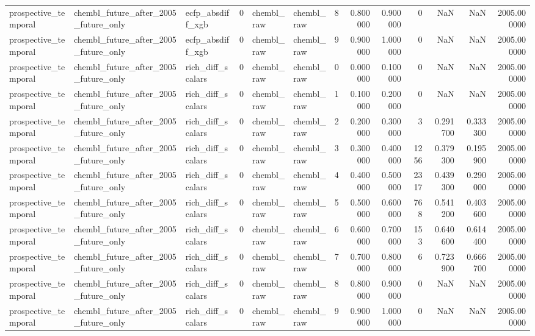 \begin{longtable}{lllrllrrrrrrr}
prospective\_temporal & chembl\_future\_after\_2005\_future\_only & ecfp\_absdiff\_xgb & 0 & chembl\_raw & chembl\_raw & 8 & 0.800000 & 0.900000 & 0 & NaN & NaN & 2005.000000 \\
prospective\_temporal & chembl\_future\_after\_2005\_future\_only & ecfp\_absdiff\_xgb & 0 & chembl\_raw & chembl\_raw & 9 & 0.900000 & 1.000000 & 0 & NaN & NaN & 2005.000000 \\
prospective\_temporal & chembl\_future\_after\_2005\_future\_only & rich\_diff\_scalars & 0 & chembl\_raw & chembl\_raw & 0 & 0.000000 & 0.100000 & 0 & NaN & NaN & 2005.000000 \\
prospective\_temporal & chembl\_future\_after\_2005\_future\_only & rich\_diff\_scalars & 0 & chembl\_raw & chembl\_raw & 1 & 0.100000 & 0.200000 & 0 & NaN & NaN & 2005.000000 \\
prospective\_temporal & chembl\_future\_after\_2005\_future\_only & rich\_diff\_scalars & 0 & chembl\_raw & chembl\_raw & 2 & 0.200000 & 0.300000 & 3 & 0.291700 & 0.333300 & 2005.000000 \\
prospective\_temporal & chembl\_future\_after\_2005\_future\_only & rich\_diff\_scalars & 0 & chembl\_raw & chembl\_raw & 3 & 0.300000 & 0.400000 & 1256 & 0.379300 & 0.195900 & 2005.000000 \\
prospective\_temporal & chembl\_future\_after\_2005\_future\_only & rich\_diff\_scalars & 0 & chembl\_raw & chembl\_raw & 4 & 0.400000 & 0.500000 & 2317 & 0.439300 & 0.290000 & 2005.000000 \\
prospective\_temporal & chembl\_future\_after\_2005\_future\_only & rich\_diff\_scalars & 0 & chembl\_raw & chembl\_raw & 5 & 0.500000 & 0.600000 & 768 & 0.541200 & 0.403600 & 2005.000000 \\
prospective\_temporal & chembl\_future\_after\_2005\_future\_only & rich\_diff\_scalars & 0 & chembl\_raw & chembl\_raw & 6 & 0.600000 & 0.700000 & 153 & 0.640600 & 0.614400 & 2005.000000 \\
prospective\_temporal & chembl\_future\_after\_2005\_future\_only & rich\_diff\_scalars & 0 & chembl\_raw & chembl\_raw & 7 & 0.700000 & 0.800000 & 6 & 0.723900 & 0.666700 & 2005.000000 \\
prospective\_temporal & chembl\_future\_after\_2005\_future\_only & rich\_diff\_scalars & 0 & chembl\_raw & chembl\_raw & 8 & 0.800000 & 0.900000 & 0 & NaN & NaN & 2005.000000 \\
prospective\_temporal & chembl\_future\_after\_2005\_future\_only & rich\_diff\_scalars & 0 & chembl\_raw & chembl\_raw & 9 & 0.900000 & 1.000000 & 0 & NaN & NaN & 2005.000000 \\

\end{longtable}
